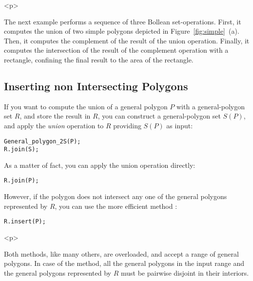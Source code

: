 \begin{ccHtmlOnly}<p>\end{ccHtmlOnly}
The next example performs a sequence of three Bollean set-operations.
First, it computes the union of two simple polygons depicted in
Figure~\ref{fig:simple}~(a). Then, it computes the complement of the result
of the union operation. Finally, it computes the intersection of the result
of the complement operation with a rectangle, confining the final result to 
the area of the rectangle.


\subsection{Inserting non Intersecting Polygons}
\label{bso_ssec:insert}
If you want to compute the union of a general polygon $P$ with a
general-polygon set $R$, and store the result in $R$, you can construct
a general-polygon set $S(P)$, and apply the {\em union} operation to
$R$ providing $S(P)$ as input:

\begin{alltt}
General_polygon_2 S(P);
R.join(S);
\end{alltt}

As a matter of fact, you can apply the union operation directly:

\begin{alltt}
R.join(P);
\end{alltt}

However, if the polygon does not intersect any one of the general
polygons represented by $R$, you can use the more efficient method
:

\begin{alltt}
R.insert(P);
\end{alltt}

\begin{ccHtmlOnly}<p>\end{ccHtmlOnly}
Both methods, like many others, are overloaded, and accept a range of
general polygons. In case of the  method, all the general
polygons in the input range and the general polygons represented by
$R$ must be pairwise disjoint in their interiors.

